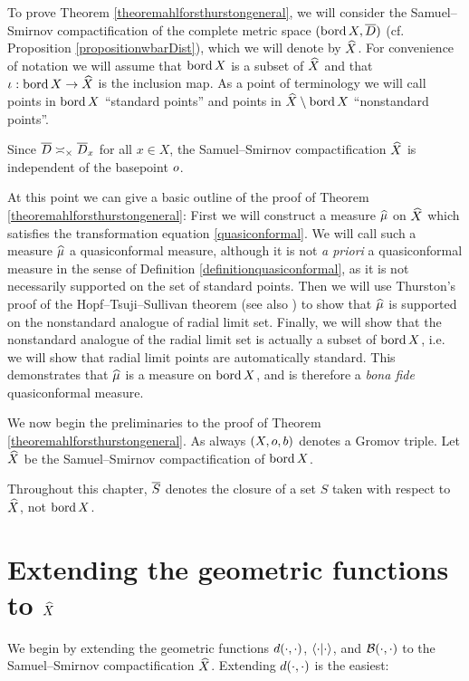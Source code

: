 To prove Theorem \ref{theoremahlforsthurstongeneral}, we will consider the Samuel--Smirnov compactification of the complete metric space $(\operatorname{bord} X,\overline{D})$ (cf. Proposition \ref{propositionwbarDist}), which we will denote by $\widehat X$. For convenience of notation we will assume that $\operatorname{bord} X$ is a subset of $\widehat X$ and that $\iota:\operatorname{bord} X\to\widehat X$ is the inclusion map. As a point of terminology we will call points in $\operatorname{bord} X$ ``standard points'' and points in $\widehat X\setminus\operatorname{bord} X$ ``nonstandard points''.

\begin{remark}
Since $\overline{D} \asymp_\times \overline{D}_x$ for all $x\in X$, the Samuel--Smirnov compactification $\widehat X$ is independent of the basepoint $o$.
\end{remark}

At this point we can give a basic outline of the proof of Theorem \ref{theoremahlforsthurstongeneral}: First we will construct a measure $\widehat\mu$ on $\widehat X$ which satisfies the transformation equation \eqref{quasiconformal}. We will call such a measure $\widehat\mu$ a quasiconformal measure, although it is not \emph{a priori} a quasiconformal measure in the sense of Definition \ref{definitionquasiconformal}, as it is not necessarily supported on the set of standard points. Then we will use Thurston's proof of the Hopf--Tsuji--Sullivan theorem \cite[Theorem 4 of Section VII]{Ahlfors} (see also \cite[Theorem 2.4.6]{Nicholls}) to show that $\widehat\mu$ is supported on the nonstandard analogue of radial limit set. Finally, we will show that the nonstandard analogue of the radial limit set is actually a subset of $\operatorname{bord} X$, i.e. we will show that radial limit points are automatically standard. This demonstrates that $\widehat\mu$ is a measure on $\operatorname{bord} X$, and is therefore a \emph{bona fide} quasiconformal measure.

We now begin the preliminaries to the proof of Theorem \ref{theoremahlforsthurstongeneral}. As always $(X,o,b)$ denotes a Gromov triple. Let $\widehat X$ be the Samuel--Smirnov compactification of $\operatorname{bord} X$.

\begin{remark}
Throughout this chapter, $\overline S$ denotes the closure of a set $S$ taken with respect to $\widehat X$, not $\operatorname{bord} X$.
\end{remark}

\section{Extending the geometric functions to $\widehat X$}
We begin by extending the geometric functions $d(\cdot,\cdot)$, $\langle\cdot|\cdot\rangle$, and $\operatorname{\mathcal B}(\cdot,\cdot)$ to the Samuel--Smirnov compactification $\widehat X$. Extending $d(\cdot,\cdot)$ is the easiest:

